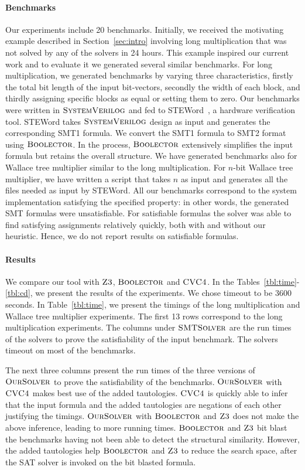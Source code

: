 \paragraph{\bf Benchmarks}
%
Our experiments include 20 benchmarks. 
%
Initially, we received the motivating example described in Section~\ref{sec:intro} involving long multiplication that was not solved by any
of the solvers in 24 hours.
%
This example inspired our current work and to evaluate it we generated several similar benchmarks.
%
For long multiplication, we generated benchmarks by varying three characteristics, firstly the total bit length of the input bit-vectors, secondly the width of each block, and thirdly assigning specific blocks as equal or setting them to zero.
%
Our benchmarks were written in $\textsc{SystemVerilog}$ and fed to STEWord~\cite{wste}, a hardware verification tool.
%
STEWord takes $\textsc{SystemVerilog}$ design as input and generates the corresponding SMT1 formula.
%
We convert the SMT1 formula to SMT2 format using $\textsc{Boolector}$.
%
In the process, $\textsc{Boolector}$ extensively simplifies the input formula but retains the overall structure.
%
We have generated benchmarks also for Wallace tree multiplier similar to the long multiplication.
%
For $n$-bit Wallace tree multiplier, we have written a script that takes $n$ as input and generates all the files needed as input by STEWord. All our benchmarks correspond to the system implementation satisfying the specified property: in other words, the generated SMT formulas were unsatisfiable. For satisfiable formulas the solver was able to find satisfying assignments relatively quickly, both with and without our heuristic. Hence, we do not report results on satisfiable formulas.
%

\paragraph{\bf Results}
%
We compare our tool with $\textsc{Z3}$, $\textsc{Boolector}$ and $\textsc{CVC4}$.
%
In the Tables~\ref{tbl:time}-\ref{tbl:cd}, we present the results of the experiments.
%
We chose timeout to be 3600 seconds.
%
In Table~\ref{tbl:time}, we present the timings of the long multiplication and
Wallace tree multiplier experiments.
%
The first 13 rows correspond to
the long multiplication experiments.
%
The columns under $\textsc{SMTSolver}$ are the run times of the
solvers to prove the satisfiability of the input benchmark.
%
The solvers timeout on most of the benchmarks.
%



The next three columns present the run times of the three versions of
$\textsc{OurSolver}$ to prove the satisfiability of the benchmarks.
%
$\textsc{OurSolver}$ with $\textsc{CVC4}$ makes best use of the added tautologies.
%
$\textsc{CVC4}$ is quickly able to infer that the input formula and the
added tautologies are negations of each other justifying the timings.
%
$\textsc{OurSolver}$ with $\textsc{Boolector}$ and $\textsc{Z3}$ does not make the above
inference, leading to more running times.
%
$\textsc{Boolector}$ and $\textsc{Z3}$ bit blast the benchmarks having not been
able to detect the structural similarity.
%
However, the added tautologies help $\textsc{Boolector}$ and $\textsc{Z3}$ to
reduce the search space, after the SAT solver is invoked on the bit
blasted formula.


